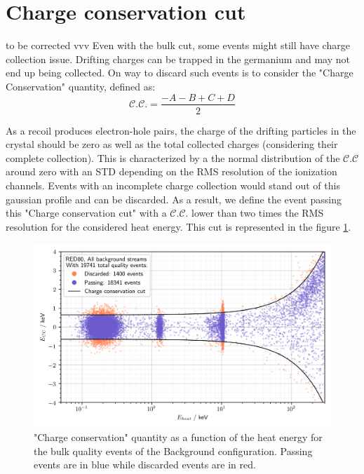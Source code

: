 \section{Charge conservation cut}
\label{par:charge-conservation-cut}

to be corrected vvv
Even with the bulk cut, some events might still have charge collection issue. Drifting charges can be trapped in the germanium and may not end up being collected. On way to discard such events is to consider the "Charge Conservation" quantity, defined as:
\begin{equation}
\mathcal{C.C.} = \frac{-A-B+C+D}{2}
\end{equation}

As a recoil produces electron-hole pairs, the charge of the drifting particles in the crystal should be zero as well as the total collected charges (considering their complete collection). This is characterized by a the normal distribution of the $\mathcal{C.C}$ around zero with an STD depending on the RMS resolution of the ionization channels. Events with an incomplete charge collection would stand out of this gaussian profile and can be discarded. As a result, we define the event passing this "Charge conservation cut" with a $\mathcal{C.C.}$ lower than two times the RMS resolution for the considered heat energy. This cut is represented in the figure \ref{fig:charge-conservation}.

\begin{figure}
\centering
\includegraphics[width=\linewidth,]{Figures/Neutron/charge_conservation.png}
\caption{"Charge conservation" quantity as a function of the heat energy for the bulk quality events of the Background configuration. Passing events are in blue while discarded events are in red.}
\label{fig:charge-conservation}
\end{figure}

